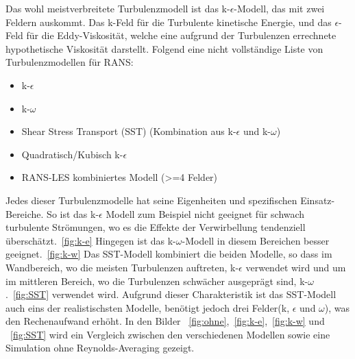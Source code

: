 \begin{refsection}
Das wohl meistverbreitete Turbulenzmodell ist das k-$\epsilon$-Modell, das mit zwei Feldern auskommt. Das k-Feld für die
Turbulente kinetische Energie, und das $\epsilon$-Feld für die Eddy-Viskosität, welche eine aufgrund der Turbulenzen errechnete
hypothetische Viskosität darstellt.
Folgend eine nicht vollständige Liste von Turbulenzmodellen für RANS:

\begin{itemize}
    \item k-$\epsilon$
    \item k-$\omega$
    \item Shear Stress Transport (SST) (Kombination aus k-$\epsilon$ und k-$\omega$)
    \item Quadratisch/Kubisch k-$\epsilon$
    \item RANS-LES kombiniertes Modell (>=4 Felder)
\end{itemize}

Jedes dieser Turbulenzmodelle hat seine Eigenheiten und spezifischen Einsatz-Bereiche.
So ist das k-$\epsilon$ Modell zum Beispiel nicht geeignet für schwach turbulente Strömungen,
wo es die Effekte der Verwirbellung tendenziell überschätzt.~\ref{fig:k-e}
Hingegen ist das k-$\omega$-Modell in diesem Bereichen besser geeignet.~\ref{fig:k-w}
Das SST-Modell kombiniert die beiden Modelle, so dass im Wandbereich,
wo die meisten Turbulenzen auftreten, k-$\epsilon$ verwendet wird und um im mittleren Bereich,
wo die Turbulenzen schwächer ausgeprägt sind, k-$\omega$.~\ref{fig:SST} verwendet wird.
Aufgrund dieser Charakteristik ist das SST-Modell auch eins der realistischsten Modelle,
benötigt jedoch drei Felder(k, $\epsilon$ und $\omega$), was den Rechenaufwand erhöht.
In den Bilder ~\ref{fig:ohne},~\ref{fig:k-e},~\ref{fig:k-w} und ~\ref{fig:SST}
wird ein Vergleich zwischen den verschiedenen Modellen sowie eine Simulation ohne
Reynolds-Averaging gezeigt.


\end{refsection}
